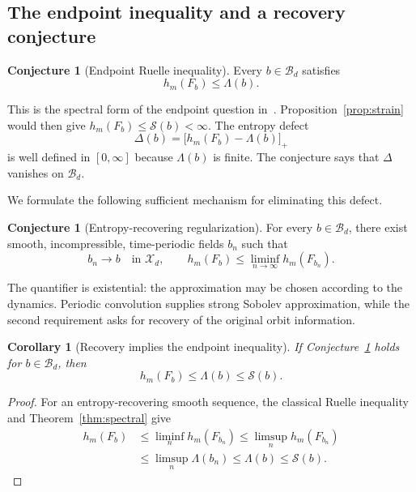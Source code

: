 \documentclass[review,12pt,times,a4paper,nopreprintline]{elsarticle}
\theoremstyle{plain}
\newtheorem{corollary}[theorem]{Corollary}
\theoremstyle{definition}
\newtheorem{conjecture}[theorem]{Conjecture}
\theoremstyle{remark}
\newcommand{\B}{\mathscr B}
\newcommand{\X}{\mathscr X}
\newcommand{\action}{\mathcal S}
\numberwithin{equation}{section}
\begin{document}
\subsection{The endpoint inequality and a recovery conjecture}
\begin{conjecture}[Endpoint Ruelle inequality]\label{conj:ERI}
Every $b\in\B_d$ satisfies
\begin{equation}\label{eq:ERI}
 h_m(F_b)\leq\Lambda(b).
\end{equation}
\end{conjecture}
This is the spectral form of the endpoint question in~\cite[Question 1.3]{BCJ}. Proposition~\ref{prop:strain} would then give $h_m(F_b)\leq\action(b)<\infty$. The entropy defect
\begin{equation}\label{eq:defect}
 \Delta(b)=\bigl[h_m(F_b)-\Lambda(b)\bigr]_+
\end{equation}
is well defined in $[0,\infty]$ because $\Lambda(b)$ is finite. The conjecture says that $\Delta$ vanishes on $\B_d$.

We formulate the following sufficient mechanism for eliminating this defect.
\begin{conjecture}[Entropy-recovering regularization]\label{conj:ERR}
For every $b\in\B_d$, there exist smooth, incompressible, time-periodic fields $b_n$ such that
\begin{equation}\label{eq:ERR}
 b_n\longrightarrow b\quad\text{in }\X_d,
 \qquad h_m(F_b)\leq\liminf_{n\to\infty}h_m(F_{b_n}).
\end{equation}
\end{conjecture}
The quantifier is existential: the approximation may be chosen according to the dynamics. Periodic convolution supplies strong Sobolev approximation, while the second requirement asks for recovery of the original orbit information.

\begin{corollary}[Recovery implies the endpoint inequality]\label{cor:reduction}
If Conjecture~\ref{conj:ERR} holds for $b\in\B_d$, then
\[
 h_m(F_b)\leq\Lambda(b)\leq\action(b).
\]
\end{corollary}
\begin{proof}
For an entropy-recovering smooth sequence, the classical Ruelle inequality~\cite{Ruelle} and Theorem~\ref{thm:spectral} give
\begin{align*}
 h_m(F_b)&\leq\liminf_n h_m(F_{b_n})
 \leq\limsup_n h_m(F_{b_n})\\
 &\leq\limsup_n\Lambda(b_n)\leq\Lambda(b)\leq\action(b).
\end{align*}
\end{proof}
\end{document}
